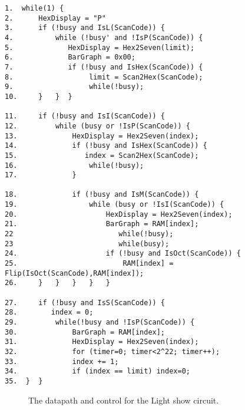 \begin{description}
        \pagebreak
\begin{verbatim}
1.  while(1) {
2.      HexDisplay = "P"
3.      if (!busy and IsL(ScanCode)) {
4.          while (!busy' and !IsP(ScanCode)) {
5.             HexDisplay = Hex2Seven(limit);
6.             BarGraph = 0x00;
7.             if (!busy and IsHex(ScanCode)) {
8.                  limit = Scan2Hex(ScanCode);
9.                  while(!busy);
10.     }   }  }

11.     if (!busy and IsI(ScanCode)) {
12.         while (busy or !IsP(ScanCode)) {
13.             HexDisplay = Hex2Seven(index);
14.             if (!busy and IsHex(ScanCode)) {
15.                index = Scan2Hex(ScanCode);
16.                 while(!busy);
17.             }

18.             if (!busy and IsM(ScanCode)) {
19.                 while (busy or !IsI(ScanCode)) {
20.                     HexDisplay = Hex2Seven(index);
21.                     BarGraph = RAM[index];
22                         while(!busy);
23                         while(busy);
24.                     if (!busy and IsOct(ScanCode)) {
25.                         RAM[index] = Flip(IsOct(ScanCode),RAM[index]);
26.     }   }   }   }   }

27.     if (!busy and IsS(ScanCode)) {
28.        index = 0;
29.         while(!busy and !IsP(ScanCode)) {
30.             BarGraph = RAM[index];
31.             HexDisplay = Hex2Seven(index);
32.             for (timer=0; timer<2^22; timer++);
33.             index += 1;
34.             if (index == limit) index=0;
35.  }  }
\end{verbatim}

        \begin{landscape}
            \begin{figure}[ht]
                \caption{The datapath and control for the Light show circuit.}
                \label{fig:LightShowCir}
            \end{figure}


\end{landscape}
\end{description}
